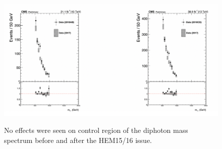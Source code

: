\begin{figure}[!htbp]
 \caption{No effects were seen on control region of the diphoton mass spectrum before and after the HEM15/16 issue.}
	\centering
   \includegraphics[scale=0.65]{fig/HEM15:16BarrelBeforeAndAfter.png}
	\label{fig:HEM1516BarrelBeforeAndAfter}
\end{figure}



\newpage
% 
% 
